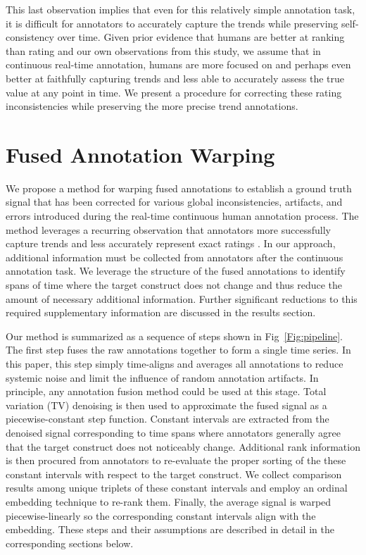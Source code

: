 \documentclass[10pt,letterpaper]{article}
\begin{document}
This last observation implies that even for this relatively simple annotation task, it is difficult for annotators to accurately capture the trends while preserving self-consistency over time.  Given prior evidence that humans are better at ranking than rating \cite{Yannakakis2011, metallinou2013annotation, yannakakis2015ratings} and our own observations from this study, we assume that in continuous real-time annotation, humans are more focused on and perhaps even better at faithfully capturing trends and less able to accurately assess the true value at any point in time.  We present a procedure for correcting these rating inconsistencies while preserving the more precise trend annotations.

\section*{Fused Annotation Warping}

We propose a method for warping fused annotations to establish a ground truth signal that has been corrected for various global inconsistencies, artifacts, and errors introduced during the real-time continuous human annotation process.  The method leverages a recurring observation that annotators more successfully capture trends and less accurately represent exact ratings \cite{Yannakakis2011, metallinou2013annotation, yannakakis2015ratings}.  In our approach, additional information must be collected from annotators after the continuous annotation task.  We leverage the structure of the fused annotations to identify spans of time where the target construct does not change and thus reduce the amount of necessary additional information.  Further significant reductions to this required supplementary information are discussed in the results section.

Our method is summarized as a sequence of steps shown in Fig~\ref{Fig:pipeline}.  The first step fuses the raw annotations together to form a single time series.  In this paper, this step simply time-aligns and averages all annotations to reduce systemic noise and limit the influence of random annotation artifacts.  In principle, any annotation fusion method could be used at this stage.  Total variation (TV) denoising is then used to approximate the fused signal as a piecewise-constant step function.  Constant intervals are extracted from the denoised signal corresponding to time spans where annotators generally agree that the target construct does not noticeably change.  Additional rank information is then procured from annotators to re-evaluate the proper sorting of the these constant intervals with respect to the target construct.  We collect comparison results among unique triplets of these constant intervals and employ an ordinal embedding technique to re-rank them.  Finally, the average signal is warped piecewise-linearly so the corresponding constant intervals align with the embedding.  These steps and their assumptions are described in detail in the corresponding sections below.
\end{document}

